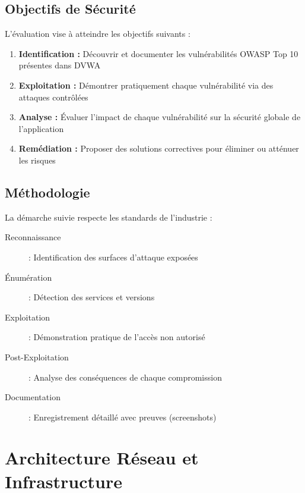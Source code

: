 \documentclass[12pt,a4paper,openany]{report}
\begin{document}
	\section{Objectifs de Sécurité}
	
	L'évaluation vise à atteindre les objectifs suivants :
	
	\begin{enumerate}
		\item \textbf{Identification :} Découvrir et documenter les vulnérabilités OWASP Top 10 présentes dans DVWA
		\item \textbf{Exploitation :} Démontrer pratiquement chaque vulnérabilité via des attaques contrôlées
		\item \textbf{Analyse :} Évaluer l'impact de chaque vulnérabilité sur la sécurité globale de l'application
		\item \textbf{Remédiation :} Proposer des solutions correctives pour éliminer ou atténuer les risques
	\end{enumerate}
	
	\section{Méthodologie}
	
	La démarche suivie respecte les standards de l'industrie :
	
	\begin{description}
		\item[Reconnaissance] : Identification des surfaces d'attaque exposées
		\item[Énumération] : Détection des services et versions
		\item[Exploitation] : Démonstration pratique de l'accès non autorisé
		\item[Post-Exploitation] : Analyse des conséquences de chaque compromission
		\item[Documentation] : Enregistrement détaillé avec preuves (screenshots)
	\end{description}
	
	
	\chapter{Architecture Réseau et Infrastructure}
	
\end{document}
